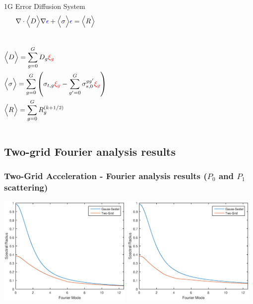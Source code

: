 \documentclass[compress,10pt]{beamer}
\renewcommand{\vec}[1]{\mathbf{#1}}
\newcommand{\tcr}[1]{\textcolor{red}{#1}}
\newcommand{\tcb}[1]{\textcolor{blue}{#1}}
\begin{document}
\begin{frame}[t]
{\begin{columns}
\begin{block}{1G Error Diffusion System}{\footnotesize
\begin{equation*}
\vec{\nabla} \cdot \Big< D \Big> \vec{\nabla} \tcb{\epsilon} + \Big< \sigma \Big> \tcb{\epsilon} = \Big< R \Big>
\end{equation*} \\ \vspace{2mm}
\begin{equation*}
\begin{aligned}
&\Big< D \Big> = \sum\displaylimits_{g=0}^{G} D_g \tcr{\xi_g} \\
&\Big< \sigma \Big> = \sum\displaylimits_{g=0}^{G} \left(  \sigma_{t,g} \tcr{\xi_g} - \sum\displaylimits_{g'=0}^{G} \sigma_{s,0}^{gg'} \tcr{\xi_g} \right) \\
&\Big< R \Big> = \sum\displaylimits_{g=0}^{G} R_g^{(k+1/2)}
\end{aligned}
\end{equation*}
}\end{block}
\end{columns}
}

\end{frame}

\subsection{Two-grid Fourier analysis results}
\begin{frame}[t]\frametitle{Two-Grid Acceleration - Fourier analysis results ($P_0$ and $P_1$ scattering)}
{\small
\vspace{15mm}
\centering
\includegraphics[width=0.485\textwidth]{images/P0_Fourier_69G.eps} \hfill
\includegraphics[width=0.485\textwidth]{images/P1_Fourier_69G.eps}
}
\end{frame}
%
\end{document}
